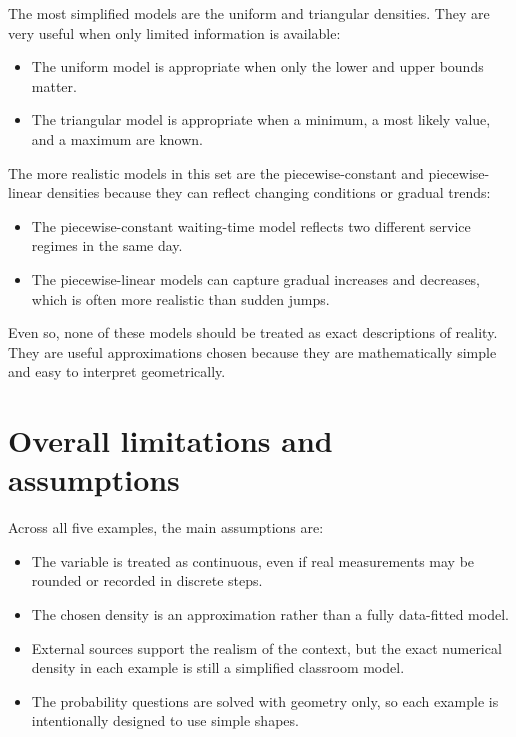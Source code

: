 \documentclass[11pt]{article}
\begin{document}
	The most simplified models are the uniform and triangular densities. They are very useful when only limited information is available:
	
	\begin{itemize}[leftmargin=*]
		\item The uniform model is appropriate when only the lower and upper bounds matter.
		\item The triangular model is appropriate when a minimum, a most likely value, and a maximum are known.
	\end{itemize}
	
	The more realistic models in this set are the piecewise-constant and piecewise-linear densities because they can reflect changing conditions or gradual trends:
	
	\begin{itemize}[leftmargin=*]
		\item The piecewise-constant waiting-time model reflects two different service regimes in the same day.
		\item The piecewise-linear models can capture gradual increases and decreases, which is often more realistic than sudden jumps.
	\end{itemize}
	
	Even so, none of these models should be treated as exact descriptions of reality. They are useful approximations chosen because they are mathematically simple and easy to interpret geometrically.
	
	\section{Overall limitations and assumptions}
	
	Across all five examples, the main assumptions are:
	
	\begin{itemize}[leftmargin=*]
		\item The variable is treated as continuous, even if real measurements may be rounded or recorded in discrete steps.
		\item The chosen density is an approximation rather than a fully data-fitted model.
		\item External sources support the realism of the context, but the exact numerical density in each example is still a simplified classroom model.
		\item The probability questions are solved with geometry only, so each example is intentionally designed to use simple shapes.
	\end{itemize}
	
\end{document}
